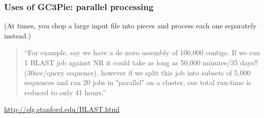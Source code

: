 \documentclass[english,serif,mathserif,xcolor=pdftex,dvipsnames,table]{beamer}
\begin{document}
\begin{frame}[fragile]
  \frametitle{Uses of GC3Pie: parallel processing}
  (At times, you chop a large input file into pieces and process each one separately instead.)

  \+
  \begin{quote}
    ``For example, say we have a de novo assembly of 100,000
    contigs. If we run 1 BLAST job against NR it could take as long as
    50,000 minutes/35 days!! (30sec/query sequence), however if we
    split this job into subsets of 5,000 sequences and ran 20 jobs in
    "parallel" on a cluster, our total run-time is reduced to only 41
    hours.''
  \end{quote}
  \begin{references}
    \url{http://sfg.stanford.edu/BLAST.html}
  \end{references}
\end{frame}
\end{document}
